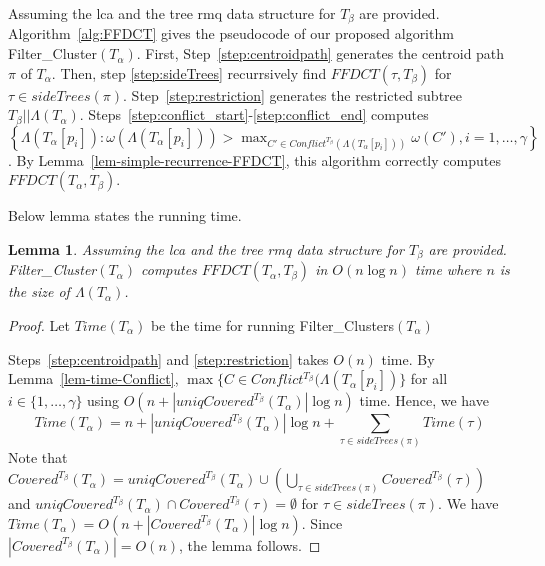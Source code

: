 \documentclass[final,1p,times]{elsarticle}
\newcommand{\weight}{\omega}
\newcommand{\TA}{T_\alpha}
\newcommand{\TB}{T_\beta}
\newtheorem{lemma}[theorem]{Lemma}
\begin{document}
	    Assuming the lca and the tree rmq data structure for $\TB$ are provided.
    Algorithm~\ref{alg:FFDCT} gives the pseudocode of our proposed algorithm Filter\_Cluster$(\TA)$. First, Step~\ref{step:centroidpath} generates the centroid path $\pi$ of $\TA$.
    Then, step \ref{step:sideTrees} recurrsively find $FFDCT(\tau, \TB)$ for $\tau \in sideTrees(\pi)$.
	    Step~\ref{step:restriction} generates the restricted subtree $\TB||\Lambda(\TA)$.
    Steps~\ref{step:conflict_start}-\ref{step:conflict_end} computes
		 $\left\{ \Lambda(\TA[p_i]) : \weight(\Lambda(\TA[p_i])) > \max_{C' \in Conflict^{\TB}(\Lambda(\TA[p_i]))} \weight(C'), i=1,\ldots, \gamma \right\}$.
	    	By Lemma~\ref{lem-simple-recurrence-FFDCT}, this algorithm correctly computes $FFDCT(\TA, \TB)$.

    Below lemma states the running time.
    \begin{lemma}
	    Assuming the lca and the tree rmq data structure for $\TB$ are provided.
	    Filter\_Cluster$(\TA)$ computes $FFDCT(\TA, \TB)$ in $O(n \log n)$ time where $n$ is the size of $\Lambda(\TA)$.
    \end{lemma}
    \begin{proof}
	    Let $Time(\TA)$ be the time for running Filter\_Clusters$(\TA)$

	    Steps~\ref{step:centroidpath} and \ref{step:restriction} takes $O(n)$ time.
	    By Lemma~\ref{lem-time-Conflict},
	    $\max \{ C \in Conflict^{\TB}(\Lambda(\TA[p_i]) \}$ for all $i \in \{1, \ldots, \gamma\}$
	    using $O\left(n + |uniqCovered^{\TB}(\TA)| \log n \right)$ time.
	    Hence, we have
	    \[ Time(\TA) = n + |uniqCovered^{\TB}(\TA)| \log n + \sum_{\tau \in sideTrees(\pi)} Time(\tau) \]
	    Note that $Covered^{\TB}(\TA) = uniqCovered^{\TB}(\TA) \cup \left( \bigcup_{\tau \in sideTrees(\pi)} Covered^{\TB}(\tau) \right)$ and $uniqCovered^{\TB}(\TA) \cap Covered^{\TB}(\tau) = \emptyset$ for $\tau \in sideTrees(\pi)$.
	    We have $Time(\TA) = O(n + |Covered^{\TB}(\TA)| \log n)$.
	    Since $|Covered^{\TB}(\TA)| = O(n)$, the lemma follows.
    \end{proof}
\end{document}
